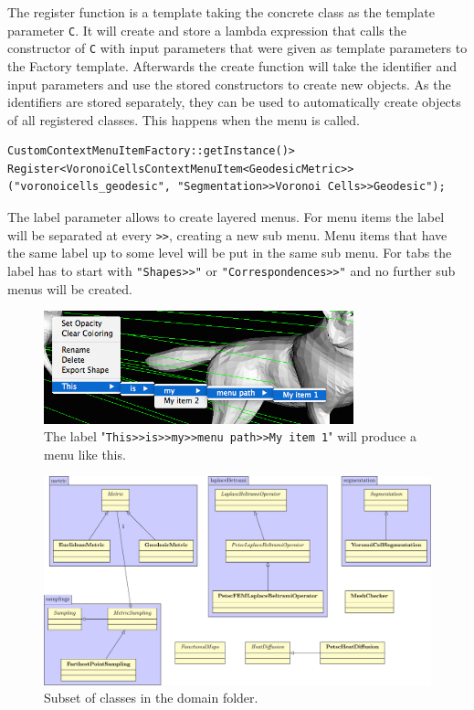 The register function is a template taking the concrete class  as the template parameter \texttt{C}. It will create and store a lambda expression that calls the constructor of \texttt{C} with input parameters that were given as template parameters to the Factory template. Afterwards the create function will take the identifier and input parameters and use the stored constructors to create new objects. As the identifiers are stored separately, they can be used to automatically create objects of all registered classes. This happens when the menu is called.

\begin{lstlisting}[style=lstStyleCpp, numbers=none]
CustomContextMenuItemFactory::getInstance()>
Register<VoronoiCellsContextMenuItem<GeodesicMetric>>
("voronoicells_geodesic", "Segmentation>>Voronoi Cells>>Geodesic");
\end{lstlisting}

The label parameter allows to create layered menus. For menu items the label will be separated at every \texttt{>>}, creating a new sub menu. Menu items that have the same label up to some level will be put in the same sub menu. For tabs the label has to start with \texttt{"Shapes>>"} or \texttt{"Correspondences>>"} and no further sub menus will be created. 

\begin{figure}[h]
	\centering
	\includegraphics[width=0.8\textwidth]{images/menu.png}
	\caption{The label "\texttt{This>>is>>my>>menu path>>My item 1}" will produce a menu like this.}
	\label{fig:MenuPath}
\end{figure}

\begin{figure}[h]
	\centering
	\includegraphics[width=\textwidth]{images/diagram2.pdf}
	\caption{Subset of classes in the domain folder.}
\end{figure}

